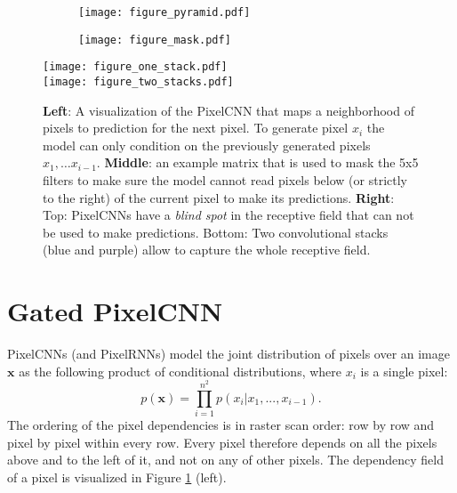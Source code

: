 \documentclass{article}
\renewcommand{\vec}{\mathbf}
\begin{document}
\begin{figure}[t]
  \centering
  \begin{subfigure}{.37\textwidth}
    \centering
    \texttt{[image: figure\_pyramid.pdf]}
  \end{subfigure}\hfill
  \begin{subfigure}{.25\textwidth}
    \centering 
    \texttt{[image: figure\_mask.pdf]}
  \end{subfigure}\hfill
  \begin{minipage}[h]{0.3\textwidth}
  \hspace*{7.5pt}
  \texttt{[image: figure\_one\_stack.pdf]}
  \\
  \texttt{[image: figure\_two\_stacks.pdf]}
  \end{minipage}

  \vspace{6pt}

  \caption{\textbf{Left}: A visualization of the PixelCNN that maps a neighborhood of pixels to prediction for the next pixel. To generate pixel $x_i$ the model can only condition on the previously generated pixels $x_1, \dots x_{i-1}$. \textbf{Middle}: an example matrix that is used to mask the 5x5 filters to make sure the model cannot read pixels below (or strictly to the right) of the current pixel to make its predictions. \textbf{Right}: Top: PixelCNNs have a \emph{blind spot} in the receptive field that can not be used to make predictions. Bottom: Two convolutional stacks (blue and purple) allow to capture the whole receptive field.}
  \label{fig:explain_pixelcnn}
\end{figure}
 \section{Gated PixelCNN}

PixelCNNs (and PixelRNNs) \cite{van2016pixel} model the joint distribution of pixels over an image $\vec{x}$ as the following product of conditional distributions, where $x_i$ is a single pixel: 
\begin{equation}
p(\vec{x}) = \prod_{i=1}^{n^2} p(x_i | x_1,...,x_{i-1}) .
\label{eq:chain_rule}
\end{equation}
The ordering of the pixel dependencies is in raster scan order: row by row and pixel by pixel within every row. Every pixel therefore depends on all the pixels above and to the left of it, and not on any of other pixels. The dependency field of a pixel is visualized in Figure \ref{fig:explain_pixelcnn} (left). 
 
\end{document}
